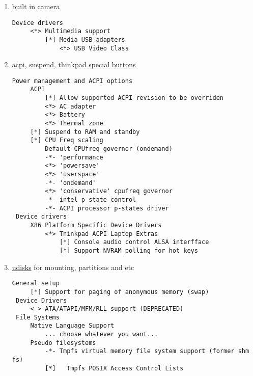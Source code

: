 \documentclass[10pt,a4paper]{article}
\begin{document}
\begin{enumerate}
                    \newpage
                    \item built in camera
                    \begin{lstlisting}[style=KernelConfig]
 Device drivers
     <*> Multimedia support
         [*] Media USB adapters
             <*> USB Video Class
                    \end{lstlisting}

                    \newpage
                    \item \href{https://wiki.gentoo.org/wiki/ACPI#Kernel}{acpi}, \href{https://wiki.gentoo.org/wiki/Suspend_and_hibernate}{suspend}, \href{https://wiki.gentoo.org/wiki/ACPI/ThinkPad-special-buttons#Preparation}{thinkpad special buttons}

                        \begin{lstlisting}[style=KernelConfig]
 Power management and ACPI options
     ACPI
         [*] Allow supported ACPI revision to be overriden
         <*> AC adapter
         <*> Battery
         <*> Thermal zone
     [*] Suspend to RAM and standby
     [*] CPU Freq scaling
         Default CPUfreq governor (ondemand)
         -*- 'performance
         <*> 'powersave'
         <*> 'userspace'
         -*- 'ondemand'
         <*> 'conservative' cpufreq governor
         -*- intel p state control
         -*- ACPI processor p-states driver
 Device drivers
     X86 Platform Specific Device Drivers
         <*> Thinkpad ACPI Laptop Extras
             [*] Console audio control ALSA interfface
             [*] Support NVRAM polling for hot keys
                        \end{lstlisting}

                    \newpage
                    \item \href{https://wiki.gentoo.org/wiki/Udisks#Kernel}{udisks} for mounting, partitions and etc

                        \begin{lstlisting}[style=KernelConfig]
 General setup
     [*] Support for paging of anonymous memory (swap)
 Device Drivers
     < > ATA/ATAPI/MFM/RLL support (DEPRECATED)
 File Systems
     Native Language Support
         ... choose whatever you want...
     Pseudo filesystems
         -*- Tmpfs virtual memory file system support (former shm fs)
         [*]   Tmpfs POSIX Access Control Lists

                        \end{lstlisting}

                \end{enumerate}
\end{document}
